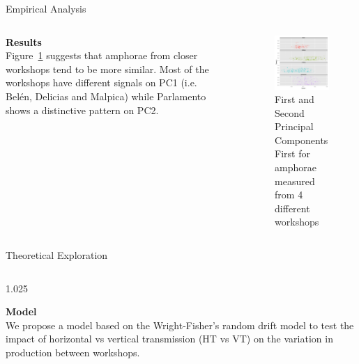 \documentclass[final]{beamer}
\newlength{\sepwid}
\newlength{\onecolwid}
\newlength{\twocolwid}
\begin{document}
\begin{frame}[t]
\begin{columns}[t]
\begin{column}{\twocolwid}
\begin{block}{Empirical Analysis}
\begin{columns}[t,totalwidth=\twocolwid]
\begin{column}{\onecolwid}
\vspace{1cm}
{\textbf{Results}}\\
\justify
Figure~\ref{fig:pca} suggests that amphorae from closer workshops tend to be more similar. Most of the workshops have different signals on PC1 (i.e. Bel\'en, Delicias and Malpica) while Parlamento shows a distinctive pattern on PC2.


\end{column}

\begin{column}{\sepwid}\end{column} %

\begin{column}{\onecolwid} %


\begin{figure}
\includegraphics[width=0.6\linewidth]{images/fig2.png}
\singlespace
\caption{First and Second Principal Components First for amphorae measured from 4 different workshops}
\label{fig:pca}
\end{figure}

\end{column}
\end{columns}

\end{block}

\begin{block}{Theoretical Exploration}

\begin{columns}[t,totalwidth=\twocolwid]

\begin{column}{1.025\onecolwid} %

{\textbf{Model }}\\
\justify
We propose a model based on the Wright-Fisher's random drift model to test the impact of horizontal vs vertical transmission (HT vs VT) on the variation in production between workshops.  %


\end{column}
\end{columns}
\end{block}
\end{column}
\end{columns}
\end{frame}
\end{document}

